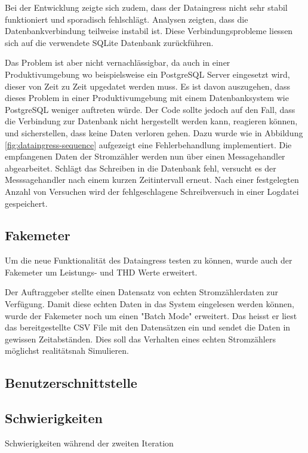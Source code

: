 Bei der Entwicklung zeigte sich zudem, dass der Dataingress nicht sehr stabil
funktioniert und sporadisch fehlschlägt. Analysen zeigten, dass
die Datenbankverbindung teilweise instabil ist. 
Diese Verbindungsprobleme liessen sich auf die verwendete SQLite Datenbank zurückführen.

Das Problem ist aber nicht vernachlässigbar, da auch in einer
Produktivumgebung wo beispielsweise ein PostgreSQL Server eingesetzt wird,
dieser von Zeit zu Zeit upgedatet werden muss.
Es ist davon auszugehen, dass dieses Problem in einer Produktivumgebung mit einem Datenbanksystem wie PostgreSQL
weniger auftreten würde.
Der Code sollte jedoch auf den Fall, dass die Verbindung zur Datenbank nicht hergestellt werden kann, reagieren können,
und sicherstellen, dass keine Daten verloren gehen.
Dazu wurde wie in Abbildung \ref{fig:dataingress-sequence} aufgezeigt
eine Fehlerbehandlung implementiert. 
Die empfangenen Daten der Stromzähler
werden nun über einen Messagehandler abgearbeitet.
Schlägt das Schreiben in die Datenbank fehl, versucht es der Messsagehandler nach einem kurzen Zeitintervall erneut.
Nach einer festgelegten Anzahl von Versuchen wird der fehlgeschlagene Schreibversuch in einer Logdatei gespeichert.

\subsection{Fakemeter}

Um die neue Funktionalität des Dataingress testen zu können, wurde auch der
Fakemeter um Leistungs- und THD Werte erweitert.

Der Auftraggeber stellte einen Datensatz von echten Stromzählerdaten
zur Verfügung. Damit diese echten Daten in das System eingelesen werden können,
wurde der Fakemeter noch um einen "Batch Mode" erweitert. Das heisst
er liest das bereitgestellte CSV File mit den Datensätzen ein und sendet die Daten in
gewissen Zeitabständen. Dies soll das Verhalten eines echten Stromzählers
möglichst realitätsnah Simulieren.

\subsection{Benutzerschnittstelle}

\subsection{Schwierigkeiten}
Schwierigkeiten während der zweiten Iteration
